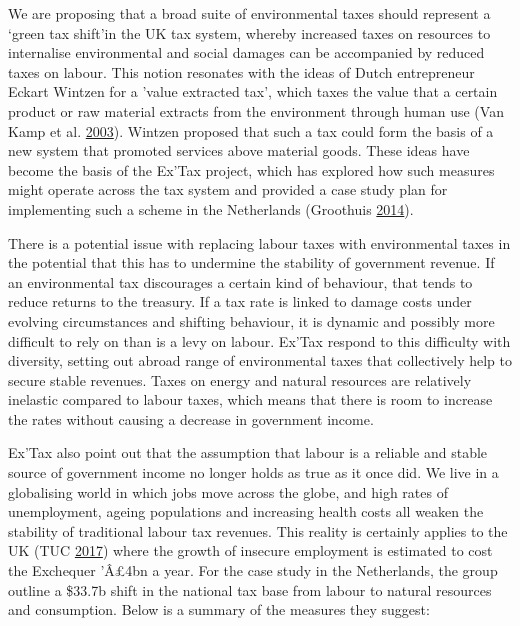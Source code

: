 \documentclass[]{tufte-handout}
\begin{document}
We are proposing that a broad suite of environmental taxes should
represent a `green tax shift'in the UK tax system, whereby increased
taxes on resources to internalise environmental and social damages can
be accompanied by reduced taxes on labour. This notion resonates with
the ideas of Dutch entrepreneur Eckart Wintzen for a 'value extracted
tax', which taxes the value that a certain product or raw material
extracts from the environment through human use (Van Kamp et al.
\protect\hyperlink{ref-VanKamp2003}{2003}). Wintzen proposed that such a
tax could form the basis of a new system that promoted services above
material goods. These ideas have become the basis of the Ex'Tax project,
which has explored how such measures might operate across the tax system
and provided a case study plan for implementing such a scheme in the
Netherlands (Groothuis \protect\hyperlink{ref-Groothuis2014}{2014}).

There is a potential issue with replacing labour taxes with
environmental taxes in the potential that this has to undermine the
stability of government revenue. If an environmental tax discourages a
certain kind of behaviour, that tends to reduce returns to the treasury.
If a tax rate is linked to damage costs under evolving circumstances and
shifting behaviour, it is dynamic and possibly more difficult to rely on
than is a levy on labour. Ex'Tax respond to this difficulty with
diversity, setting out abroad range of environmental taxes that
collectively help to secure stable revenues. Taxes on energy and natural
resources are relatively inelastic compared to labour taxes, which means
that there is room to increase the rates without causing a decrease in
government income.

Ex'Tax also point out that the assumption that labour is a reliable and
stable source of government income no longer holds as true as it once
did. We live in a globalising world in which jobs move across the globe,
and high rates of unemployment, ageing populations and increasing health
costs all weaken the stability of traditional labour tax revenues. This
reality is certainly applies to the UK (TUC
\protect\hyperlink{ref-TUC2017}{2017}) where the growth of insecure
employment is estimated to cost the Exchequer 'Â£4bn a year. For the
case study in the Netherlands, the group outline a \$33.7b shift in the
national tax base from labour to natural resources and consumption.
Below is a summary of the measures they suggest:
\end{document}
